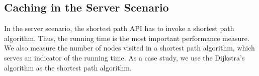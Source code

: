 

\subsection{Caching in the Server Scenario}\label{subsec:expServer}
%
In the server scenario, the shortest path API has to invoke a shortest path algorithm.
Thus, the running time is the most important performance measure. We also measure the number of nodes visited in a shortest path algorithm, which serves an indicator of the running time.
As a case study, we use the Dijkstra's algorithm as the shortest path algorithm.

